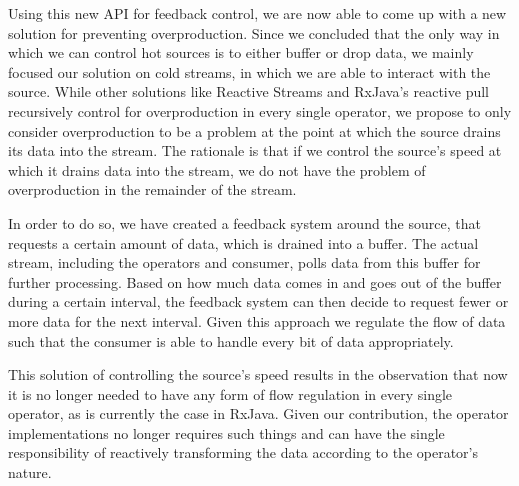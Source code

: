 Using this new API for feedback control, we are now able to come up with a new solution for preventing overproduction. Since we concluded that the only way in which we can control hot sources is to either buffer or drop data, we mainly focused our solution on cold streams, in which we are able to interact with the source. While other solutions like Reactive Streams and RxJava's reactive pull recursively control for overproduction in every single operator, we propose to only consider overproduction to be a problem at the point at which the source drains its data into the stream. The rationale is that if we control the source's speed at which it drains data into the stream, we do not have the problem of overproduction in the remainder of the stream.

In order to do so, we have created a feedback system around the source, that requests a certain amount of data, which is drained into a buffer. The actual stream, including the operators and consumer, polls data from this buffer for further processing. Based on how much data comes in and goes out of the buffer during a certain interval, the feedback system can then decide to request fewer or more data for the next interval. Given this approach we regulate the flow of data such that the consumer is able to handle every bit of data appropriately.

This solution of controlling the source's speed results in the observation that now it is no longer needed to have any form of flow regulation in every single operator, as is currently the case in RxJava. Given our contribution, the operator implementations no longer requires such things and can have the single responsibility of reactively transforming the data according to the operator's nature.
